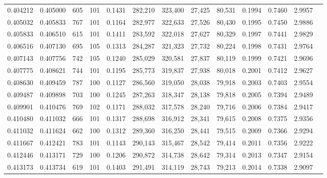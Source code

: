 \begin{tabular}{rrrrrrrrrrrrr}
0.404212 & 0.405000 &    605 &   101 &                                     0.1431 & 282,210 & 323,400 &  27,425 &  80,531 & 0.1994 & 0.7460 & 2.9957 \\
0.405032 & 0.405833 &    767 &   101 &                                     0.1164 & 282,977 & 322,633 &  27,526 &  80,430 & 0.1995 & 0.7450 & 2.9886 \\
0.405833 & 0.406510 &    615 &   101 &                                     0.1411 & 283,592 & 322,018 &  27,627 &  80,329 & 0.1997 & 0.7441 & 2.9829 \\
0.406516 & 0.407130 &    695 &   105 &                                     0.1313 & 284,287 & 321,323 &  27,732 &  80,224 & 0.1998 & 0.7431 & 2.9764 \\
0.407143 & 0.407756 &    742 &   105 &                                     0.1240 & 285,029 & 320,581 &  27,837 &  80,119 & 0.1999 & 0.7421 & 2.9696 \\
0.407775 & 0.408621 &    744 &   101 &                                     0.1195 & 285,773 & 319,837 &  27,938 &  80,018 & 0.2001 & 0.7412 & 2.9627 \\
0.408630 & 0.409459 &    787 &   100 &                                     0.1127 & 286,560 & 319,050 &  28,038 &  79,918 & 0.2003 & 0.7403 & 2.9554 \\
0.409487 & 0.409898 &    703 &   100 &                                     0.1245 & 287,263 & 318,347 &  28,138 &  79,818 & 0.2005 & 0.7394 & 2.9489 \\
0.409901 & 0.410476 &    769 &   102 &                                     0.1171 & 288,032 & 317,578 &  28,240 &  79,716 & 0.2006 & 0.7384 & 2.9417 \\
0.410480 & 0.411032 &    666 &   101 &                                     0.1317 & 288,698 & 316,912 &  28,341 &  79,615 & 0.2008 & 0.7375 & 2.9356 \\
0.411032 & 0.411624 &    662 &   100 &                                     0.1312 & 289,360 & 316,250 &  28,441 &  79,515 & 0.2009 & 0.7366 & 2.9294 \\
0.411667 & 0.412421 &    783 &   101 &                                     0.1143 & 290,143 & 315,467 &  28,542 &  79,414 & 0.2011 & 0.7356 & 2.9222 \\
0.412446 & 0.413171 &    729 &   100 &                                     0.1206 & 290,872 & 314,738 &  28,642 &  79,314 & 0.2013 & 0.7347 & 2.9154 \\
0.413173 & 0.413734 &    619 &   101 &                                     0.1403 & 291,491 & 314,119 &  28,743 &  79,213 & 0.2014 & 0.7338 & 2.9097 \\

\end{tabular}
